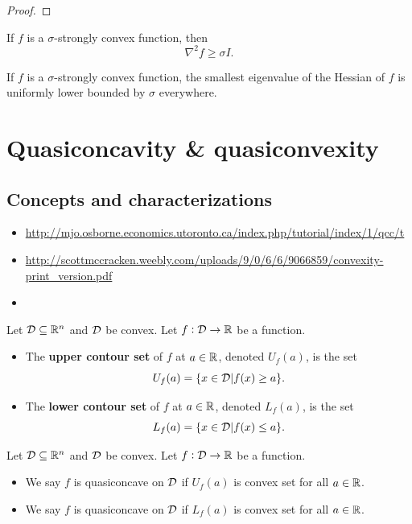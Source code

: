 \begin{refsection}
\begin{proof}
\end{proof}



\begin{lemma}

If $f$ is a $\sigma$-strongly convex function, then
$$\nabla^2 f \geq \sigma I.$$
\end{lemma}


\begin{remark}
If $f$ is a $\sigma$-strongly convex function, the smallest eigenvalue of the Hessian of $f$ is uniformly
lower bounded by $\sigma$ everywhere.
\end{remark}


\section{Quasiconcavity \& quasiconvexity} 
\subsection{Concepts and characterizations}
\begin{remark}\hfill
	\begin{itemize}
		\item 	\url{http://mjo.osborne.economics.utoronto.ca/index.php/tutorial/index/1/qcc/t}
		\item 
		\url{http://scottmccracken.weebly.com/uploads/9/0/6/6/9066859/convexity-print_version.pdf} 
		\item \cite{simon1994mathematics}
	\end{itemize}
	
\end{remark}


\begin{definition}
	Let $\mathcal{D}\subseteq \mathbb{R}^n$ and $\mathcal{D}$ be convex. Let $f:\mathcal{D}\to \mathbb{R}$ be a function.
	\begin{itemize}
		\item The \textbf{upper contour set} of $f$ at $a\in\mathbb{R}$, denoted $U_f(a)$, is the set
		$$U_f(a) = \{x\in\mathcal{D}|f(x)\geq a\}.$$
		\item The \textbf{lower contour set} of $f$ at $a\in\mathbb{R}$, denoted $L_f(a)$, is the set
		$$L_f(a) = \{x\in\mathcal{D}|f(x)\leq a\}.$$
	\end{itemize}
\end{definition}

\begin{definition}\cite[523]{simon1994mathematics}
	Let $\mathcal{D}\subseteq \mathbb{R}^n$ and $\mathcal{D}$ be convex. Let $f:\mathcal{D}\to \mathbb{R}$ be a function. 
	\begin{itemize}
		\item We say $f$ is quasiconcave on $\mathcal{D}$ if $U_f(a)$ is convex set for all $a\in\mathbb{R}$. 
		\item We say $f$ is quasiconcave on $\mathcal{D}$ if $L_f(a)$ is convex set for all $a\in\mathbb{R}$. 
		

\end{itemize}
\end{definition}
\end{refsection}
